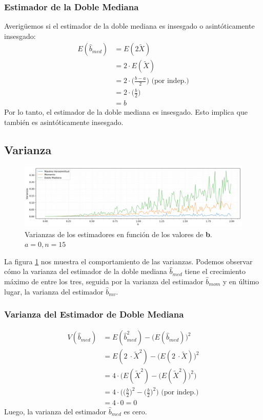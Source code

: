 \subsubsection{Estimador de la Doble Mediana}
Averigüemos si el estimador de la doble mediana es insesgado o asintóticamente insesgado:
\begin{align*}
	E(\hat{b}_{med}) &= E(2\tilde{X}) \\
	 	 			 &= 2 \cdot E(\tilde{X}) \\
	 	 			 &= 2 \cdot \Big(\frac{b - a}{2}\Big) \text{ (por indep.)}\\
	 	 			 &= 2 \cdot \Big(\frac{b}{2}\Big) \\
	 	 			 &= b
\end{align*}
Por lo tanto, el estimador de la doble mediana es insesgado. Esto implica que también es asintóticamente insesgado.

\subsection{Varianza}
\begin{figure}[H]
	\centering
	\includegraphics[width=1\textwidth]{imagenes/varianzas.png}
	\caption{\footnotesize Varianzas de los estimadores en función de los valores de \textbf{b}. $a=0, n=15$}
	\label{fig:ej6-varianzas}
\end{figure}

La figura \ref{fig:ej6-varianzas} nos muestra el comportamiento de las varianzas. Podemos observar cómo la varianza del estimador de la doble mediana $\hat{b}_{med}$ tiene el crecimiento máximo de entre los tres, seguida por la varianza del estimador $\hat{b}_{mom}$ y en último lugar, la varianza del estimador $\hat{b}_{mv}$.

\subsubsection{Varianza del Estimador de Doble Mediana}
\begin{align*}
	V(\hat{b}_{med}) &= E(\hat{b}^{2}_{med}) - \Big(E(\hat{b}_{med})\Big)^2 		\\
					 &= E(2 \ \cdot \tilde{X}^2) - \Big(E(2 \ \cdot \tilde{X})\Big)^2 \\
					 &= 4 \cdot \Bigg( E(\tilde{X}^2) - \Big(E(\tilde{X}^2)\Big)^2\Bigg)	\\
	 	 			 &= 4 \cdot \Bigg( \Big(\frac{b}{2}\Big)^2 - \Big(\frac{b}{2}\Big)^2 \Bigg) \text{ (por indep.)}		\\
	 	 			 &= 4 \cdot 0 = 0
\end{align*}
Luego, la varianza del estimador $\hat{b}_{med}$ es cero.

